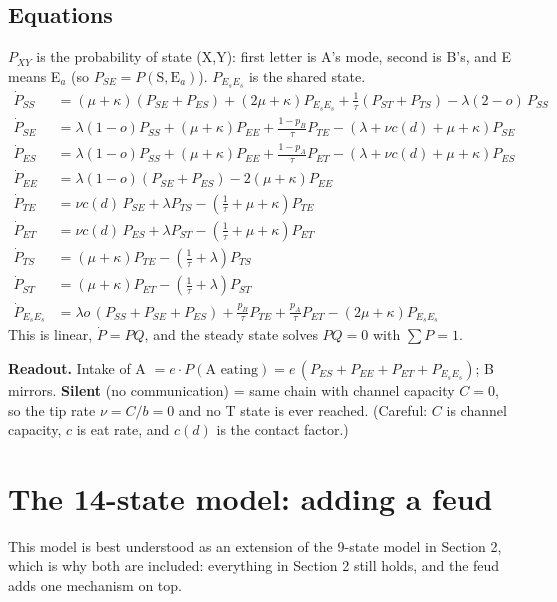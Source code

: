 \documentclass[11pt]{article}
\begin{document}
\subsection*{Equations}
$P_{XY}$ is the probability of state (X,Y): first letter is A's mode, second is B's, and E means E$_a$
(so $P_{SE} = P(\text{S},\text{E}_a)$). $P_{E_sE_s}$ is the shared state.
{\small
\begin{align*}
\dot P_{SS} &= (\mu+\kappa)(P_{SE}+P_{ES}) + (2\mu+\kappa) P_{E_sE_s} + \tfrac1\tau(P_{ST}+P_{TS}) - \lambda(2-o)\,P_{SS}\\
\dot P_{SE} &= \lambda(1-o)P_{SS} + (\mu+\kappa) P_{EE} + \tfrac{1-p_B}{\tau}P_{TE} - (\lambda + \nu c(d) + \mu+\kappa)P_{SE}\\
\dot P_{ES} &= \lambda(1-o)P_{SS} + (\mu+\kappa) P_{EE} + \tfrac{1-p_A}{\tau}P_{ET} - (\lambda + \nu c(d) + \mu+\kappa)P_{ES}\\
\dot P_{EE} &= \lambda(1-o)(P_{SE}+P_{ES}) - 2(\mu+\kappa)P_{EE}\\
\dot P_{TE} &= \nu c(d)\,P_{SE} + \lambda P_{TS} - (\tfrac1\tau + \mu+\kappa)P_{TE}\\
\dot P_{ET} &= \nu c(d)\,P_{ES} + \lambda P_{ST} - (\tfrac1\tau + \mu+\kappa)P_{ET}\\
\dot P_{TS} &= (\mu+\kappa) P_{TE} - (\tfrac1\tau + \lambda)P_{TS}\\
\dot P_{ST} &= (\mu+\kappa) P_{ET} - (\tfrac1\tau + \lambda)P_{ST}\\
\dot P_{E_sE_s} &= \lambda o\,(P_{SS}+P_{SE}+P_{ES}) + \tfrac{p_B}{\tau}P_{TE} + \tfrac{p_A}{\tau}P_{ET} - (2\mu+\kappa) P_{E_sE_s}
\end{align*}}
This is linear, $\dot P = PQ$, and the steady state solves $PQ = 0$ with $\sum P = 1$.

\textbf{Readout.} Intake of A $= e\cdot P(\text{A eating}) = e\,(P_{ES}+P_{EE}+P_{ET}+P_{E_sE_s})$; B mirrors.
\textbf{Silent} (no communication) = same chain with channel capacity $C = 0$, so the tip rate $\nu = C/b = 0$
and no T state is ever reached. (Careful: $C$ is channel capacity, $c$ is eat rate, and $c(d)$ is the contact factor.)

\section{The 14-state model: adding a feud}

This model is best understood as an extension of the 9-state model in Section 2, which is why both are included:
everything in Section 2 still holds, and the feud adds one mechanism on top.
\end{document}
